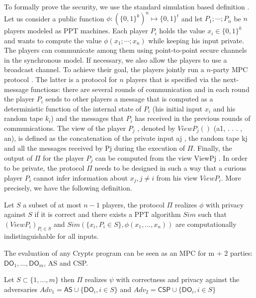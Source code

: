 {To formally prove the security, we use the standard simulation based definition \cite{Goldreich}.
Let us consider a public function $\phi: (\{0,1\}^k)^n\mapsto \{0,1\}^t$ and let $P_1; \cdots ; P_n$ be $n$ players modeled
as PPT machines. Each player $P_i$ holds the value $x_i \in \{0,1\}^k$ and wants to compute the
value $\phi(x_1;\cdots ; x_n)$ while keeping his input private. The players can communicate among
them using point-to-point secure channels in the synchronous model. If necessary, we
also allow the players to use a broadcast channel. To achieve their goal, the players jointly
run a $n$-party MPC protocol . The latter is a protocol for $n$ players that is specified via the
next-message functions: there are several rounds of communication and in each round the player $P_i$ sends to other players a message that is computed as a deterministic function
of the internal state of $P_i$ (his initial input $x_i$ and his random tape $k_i$) and the messages
that $P_i$ has received in the previous rounds of communications. The view of the player $P_j$
,
denoted by $ViewP_j()$
(a1, . . . , an), is defined as the concatenation of the private input aj
, the
random tape kj and all the messages received by Pj during the execution of $\Pi$. Finally, the
output of $\Pi$ for the player $P_j$ can be computed from the view ViewPj
. In order to be private,
the protocol $\Pi$ needs to be designed in such a way that a curious player $P_i$ cannot infer
information about $x_j, j \neq i$  from his view $ViewP_i$.
More precisely, we have the following definition.

\begin{definition}  Let $S$ a subset of at most $n - 1$ players, the protocol $\Pi$ realizes $\phi$ with privacy against
$S$ if it is correct and there exists a PPT algorithm $Sim$ such that $(ViewP_i)_{P_i\in S}$ and
$Sim(\{x_i,P_i\in S\} , \phi(x_1, . . . , x_n))$ are computationally indistinguishable for all inputs.
 \end{definition}
The evaluation of any Crypt$\epsilon$ program can  be seen as an MPC for m + 2 parties: $\textsf{DO}_1, . . . , \textsf{DO}_m$, \textsf{AS} and
\textsf{CSP}.

\begin{theorem}Let $S \subset \{1,...,m\}$ then $\Pi$ realizes $\psi$  with correctness and privacy against
the adversaries $Adv_1=\textsf{AS} \cup \{\textsf{DO}_i, i \in S\}$  and $Adv_2=\textsf{CSP} \cup  \{ \textsf{DO}_i, i \in S\} $\end{theorem}}
